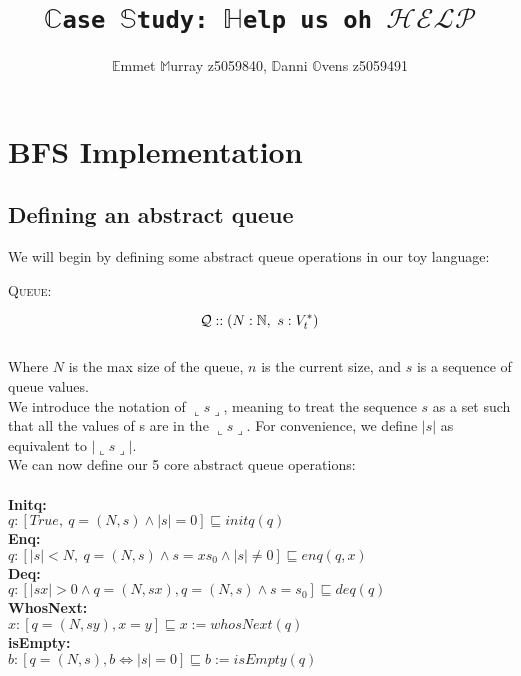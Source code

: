 \documentclass[a4paper]{scrartcl}
\title{\texttt{$\mathbb{C}$ase $\mathbb{S}$tudy: $\mathbb{H}$elp us oh $\mathcal{HELP}$}}
\author{$\mathbb{E}$mmet $\mathbb{M}$urray z5059840, $\mathbb{D}$anni $\mathbb{O}$vens z5059491}
\newcommand{\N}{\mathbb{N}}
\newcommand{\refinedby}{\sqsubseteq} %
\begin{document}
\maketitle
\section{BFS Implementation}
%
\subsection{Defining an abstract queue}
We will begin by defining some abstract queue operations in our toy language: \\
\begin{center}
{\LARGE{\textsc{Queue:}}\normalsize}
\end{center}
\begin{equation*}
\mathcal{Q} :: ( N:\N, ~s:V_{t}^{*} ) \\
\end{equation*} \\
%
Where $N$ is the max size of the queue, $n$ is the current size, and $s$ is a sequence of queue values. \\
%
We introduce the notation of $\llcorner s \lrcorner$, meaning to treat the sequence $s$ as a set such that all the values of s are in the $\llcorner s \lrcorner$. For convenience, we define $|s|$ as equivalent to $|\llcorner s \lrcorner|$.\\
%
We can now define our 5 core abstract queue operations: \\ \\
%
\textbf{Initq:} \\
$q : [True, ~ q = ( N, s) \land |s| = 0] \refinedby initq(q)$ \\
\textbf{Enq:} \\
$q : [|s| < N, ~ q = ( N, s) \land s = xs_0 \land |s| \neq 0] \refinedby enq(q, x)$ \\
\textbf{Deq:} \\
$q : [|sx| > 0 \land q = (N, sx), q = (N, s) \land s = s_0 ] \refinedby  deq(q)$ \\
\textbf{WhosNext:} \\
$x : [q = (N, sy), x = y] \refinedby x := whosNext(q)$ \\
\textbf{isEmpty:} \\
$b : [q = (N, s), b \iff |s| = 0 ] \refinedby b := isEmpty(q)$\\
%
\end{document}
